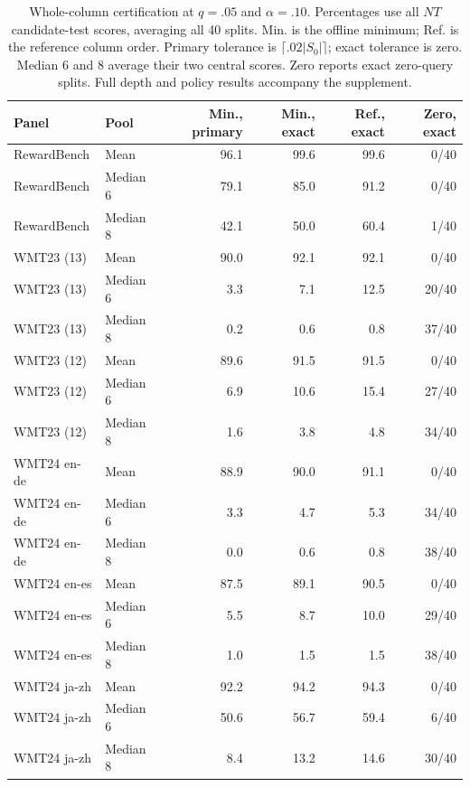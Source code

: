 \begin{table}[t]
\centering\small
\begin{tabular}{llrrrr}
\toprule
Panel & Pool & Min., primary & Min., exact & Ref., exact & Zero, exact \\
\midrule
RewardBench & Mean & 96.1 & 99.6 & 99.6 & 0/40 \\
RewardBench & Median 6 & 79.1 & 85.0 & 91.2 & 0/40 \\
RewardBench & Median 8 & 42.1 & 50.0 & 60.4 & 1/40 \\
WMT23 (13) & Mean & 90.0 & 92.1 & 92.1 & 0/40 \\
WMT23 (13) & Median 6 & 3.3 & 7.1 & 12.5 & 20/40 \\
WMT23 (13) & Median 8 & 0.2 & 0.6 & 0.8 & 37/40 \\
WMT23 (12) & Mean & 89.6 & 91.5 & 91.5 & 0/40 \\
WMT23 (12) & Median 6 & 6.9 & 10.6 & 15.4 & 27/40 \\
WMT23 (12) & Median 8 & 1.6 & 3.8 & 4.8 & 34/40 \\
WMT24 en-de & Mean & 88.9 & 90.0 & 91.1 & 0/40 \\
WMT24 en-de & Median 6 & 3.3 & 4.7 & 5.3 & 34/40 \\
WMT24 en-de & Median 8 & 0.0 & 0.6 & 0.8 & 38/40 \\
WMT24 en-es & Mean & 87.5 & 89.1 & 90.5 & 0/40 \\
WMT24 en-es & Median 6 & 5.5 & 8.7 & 10.0 & 29/40 \\
WMT24 en-es & Median 8 & 1.0 & 1.5 & 1.5 & 38/40 \\
WMT24 ja-zh & Mean & 92.2 & 94.2 & 94.3 & 0/40 \\
WMT24 ja-zh & Median 6 & 50.6 & 56.7 & 59.4 & 6/40 \\
WMT24 ja-zh & Median 8 & 8.4 & 13.2 & 14.6 & 30/40 \\
\bottomrule
\end{tabular}
\caption{Whole-column certification at $q=.05$ and $\alpha=.10$. Percentages use all $NT$ candidate-test scores, averaging all 40 splits. Min. is the offline minimum; Ref. is the reference column order. Primary tolerance is $\lceil.02|S_0|\rceil$; exact tolerance is zero. Median 6 and 8 average their two central scores. Zero reports exact zero-query splits. Full depth and policy results accompany the supplement.}
\label{tab:mean-even-columns}
\end{table}
